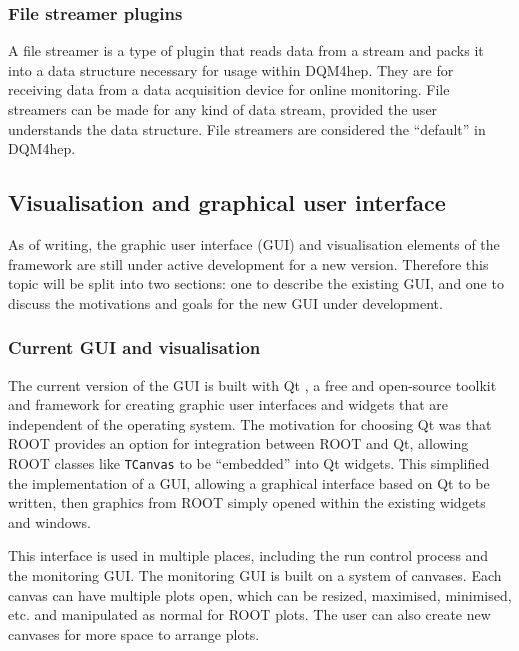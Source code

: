 \subsubsection{File streamer plugins}
A file streamer is a type of plugin that reads data from a stream and packs it into a data structure necessary for usage within \acrshort{DQM4hep}. They are for receiving data from a data acquisition device for online monitoring. File streamers can be made for any kind of data stream, provided the user understands the data structure. File streamers are considered the ``default'' in \acrshort{DQM4hep}.

\subsection{Visualisation and graphical user interface}
As of writing, the graphic user interface (\acrshort{GUI}) and visualisation elements of the framework are still under active development for a new version. Therefore this topic will be split into two sections: one to describe the existing \acrshort{GUI}, and one to discuss the motivations and goals for the new \acrshort{GUI} under development. 

\subsubsection{Current GUI and visualisation} 
The current version of the \acrshort{GUI} is built with Qt  , a free and open-source toolkit and framework for creating graphic user interfaces and widgets that are independent of the operating system. The motivation for choosing Qt was that ROOT provides an option for integration between ROOT and Qt, allowing ROOT classes like \texttt{TCanvas} to be ``embedded'' into Qt widgets. This simplified the implementation of a \acrshort{GUI}, allowing a graphical interface based on Qt to be written, then graphics from ROOT simply opened within the existing widgets and windows. %

This interface is used in multiple places, including the run control process and the monitoring \acrshort{GUI}. The monitoring \acrshort{GUI} is built on a system of canvases. Each canvas can have multiple plots open, which can be resized, maximised, minimised, etc. and manipulated as normal for ROOT plots. The user can also create new canvases for more space to arrange plots.

